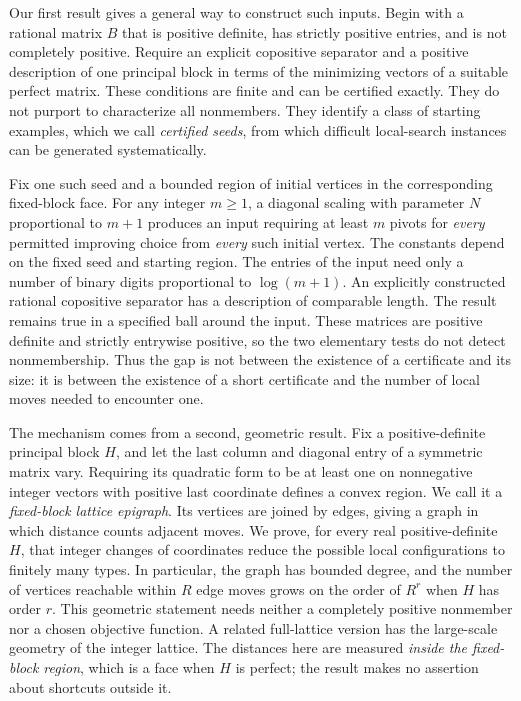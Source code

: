 Our first result gives a general way to construct such inputs. Begin with a rational matrix $B$ that is positive definite, has strictly positive entries, and is not completely positive. Require an explicit copositive separator and a positive description of one principal block in terms of the minimizing vectors of a suitable perfect matrix. These conditions are finite and can be certified exactly. They do not purport to characterize all nonmembers. They identify a class of starting examples, which we call \emph{certified seeds}, from which difficult local-search instances can be generated systematically.

Fix one such seed and a bounded region of initial vertices in the corresponding fixed-block face. For any integer $m\ge1$, a diagonal scaling with parameter $N$ proportional to $m+1$ produces an input requiring at least $m$ pivots for \emph{every} permitted improving choice from \emph{every} such initial vertex. The constants depend on the fixed seed and starting region. The entries of the input need only a number of binary digits proportional to $\log(m+1)$. An explicitly constructed rational copositive separator has a description of comparable length. The result remains true in a specified ball around the input. These matrices are positive definite and strictly entrywise positive, so the two elementary tests do not detect nonmembership. Thus the gap is not between the existence of a certificate and its size: it is between the existence of a short certificate and the number of local moves needed to encounter one.

The mechanism comes from a second, geometric result. Fix a positive-definite principal block $H$, and let the last column and diagonal entry of a symmetric matrix vary. Requiring its quadratic form to be at least one on nonnegative integer vectors with positive last coordinate defines a convex region. We call it a \emph{fixed-block lattice epigraph}. Its vertices are joined by edges, giving a graph in which distance counts adjacent moves. We prove, for every real positive-definite $H$, that integer changes of coordinates reduce the possible local configurations to finitely many types. In particular, the graph has bounded degree, and the number of vertices reachable within $R$ edge moves grows on the order of $R^r$ when $H$ has order $r$. This geometric statement needs neither a completely positive nonmember nor a chosen objective function. A related full-lattice version has the large-scale geometry of the integer lattice. The distances here are measured \emph{inside the fixed-block region}, which is a face when $H$ is perfect; the result makes no assertion about shortcuts outside it.

